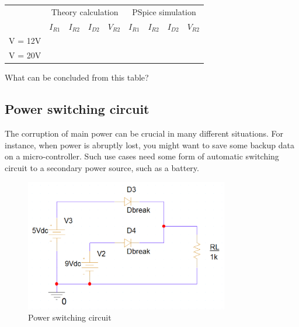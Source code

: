 \begin{center}

    \begin{tabular}{l|l|l|l|l|l|l|l|l|}
        \cline{2-9}
                                      & \multicolumn{4}{c|}{Theory calculation} & \multicolumn{4}{c|}{PSpice simulation}                                                                                                             \\ \cline{2-9}
                                      & \multicolumn{1}{c|}{$I_{R1}$}           & \multicolumn{1}{c|}{$I_{R2}$}          & \multicolumn{1}{c|}{$I_{D2}$} & \multicolumn{1}{c|}{$V_{R2}$} & $I_{R1}$ & $I_{R2}$ & $I_{D2}$ & $V_{R2}$ \\ \hline
        \multicolumn{1}{|l|}{V = 12V} &                                         &                                        &                               &                               &          &          &          &          \\ \hline
        \multicolumn{1}{|l|}{V = 20V} &                                         &                                        &                               &                               &          &          &          &          \\ \hline
    \end{tabular}
\end{center}

What can be concluded from this table?

\subsection{Power switching circuit}

The corruption of main power can be crucial in many different situations. For instance, when power is abruptly lost, you might want to save some backup data on a micro-controller. Such use cases need some form of automatic switching circuit to a secondary power source, such as a battery.\\

\newpage

\begin{figure}[!htp]
    \label{pic:halfwave_rectifier2}
    \centering
    \includegraphics[width = 3.5in]{source/picture/bai_2/diode_12.PNG}
    \caption{Power switching circuit}
    \label{lab02_ex031d}
\end{figure}

